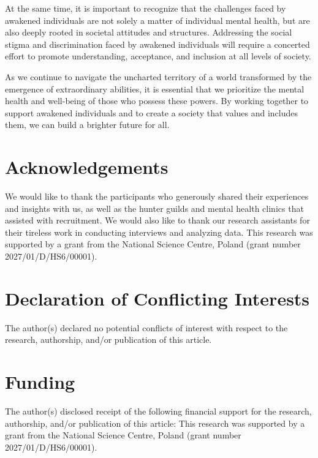 \documentclass[12pt, a4paper]{article}
\begin{document}
At the same time, it is important to recognize that the challenges faced by awakened individuals are not solely a matter of individual mental health, but are also deeply rooted in societal attitudes and structures. Addressing the social stigma and discrimination faced by awakened individuals will require a concerted effort to promote understanding, acceptance, and inclusion at all levels of society.

As we continue to navigate the uncharted territory of a world transformed by the emergence of extraordinary abilities, it is essential that we prioritize the mental health and well-being of those who possess these powers. By working together to support awakened individuals and to create a society that values and includes them, we can build a brighter future for all.

\section*{Acknowledgements}
We would like to thank the participants who generously shared their experiences and insights with us, as well as the hunter guilds and mental health clinics that assisted with recruitment. We would also like to thank our research assistants for their tireless work in conducting interviews and analyzing data. This research was supported by a grant from the National Science Centre, Poland (grant number 2027/01/D/HS6/00001).

\section*{Declaration of Conflicting Interests}
The author(s) declared no potential conflicts of interest with respect to the research, authorship, and/or publication of this article.

\section*{Funding}
The author(s) disclosed receipt of the following financial support for the research, authorship, and/or publication of this article: This research was supported by a grant from the National Science Centre, Poland (grant number 2027/01/D/HS6/00001).



\end{document}
